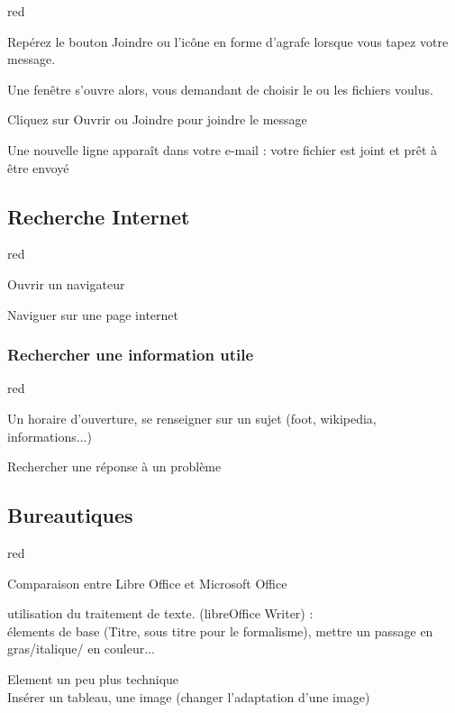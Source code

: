 {\begin{items}{red}{\Circle}

\item Repérez le bouton Joindre ou l’icône en forme d’agrafe lorsque vous tapez votre message.
\item Une fenêtre s’ouvre alors, vous demandant de choisir le ou les fichiers voulus.
\item Cliquez sur Ouvrir ou Joindre pour joindre le message

Une nouvelle ligne apparaît dans votre e-mail : votre fichier est joint et prêt à être envoyé

\end{items}






\subsection{Recherche Internet}
\begin{items}{red}{\Circle}
\item Ouvrir un navigateur
\item Naviguer sur une page internet
\end{items}

\subsubsection{Rechercher une information utile}
\begin{items}{red}{\Circle}

\item Un horaire d'ouverture, se renseigner sur un sujet (foot, wikipedia, informations...)
\item Rechercher une réponse à un problème

\end{items}

\newpage

\subsection{Bureautiques}



\begin{items}{red}{\Circle}
\item Comparaison entre Libre Office et Microsoft Office
\item utilisation du traitement de texte. (libreOffice Writer) :\\
élements de base (Titre, sous titre pour le formalisme), mettre un passage en gras/italique/ en couleur...
\item Element un peu plus technique\\
Insérer un tableau, une image (changer l'adaptation d'une image)


\end{items}}
